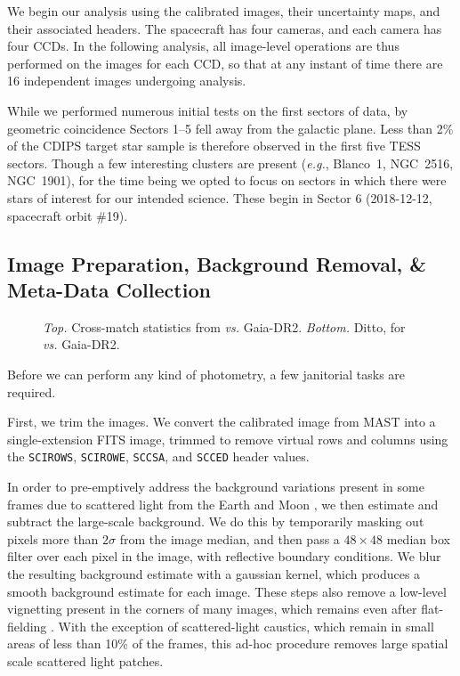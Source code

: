 \documentclass[12pt,twocolumn,tighten]{aastex62}
\begin{document}
We begin our analysis using the calibrated images, their uncertainty
maps, and their associated headers.  The spacecraft has four cameras,
and each camera has four CCDs.  In the following analysis, all
image-level operations are thus performed on the images for each CCD,
so that at any instant of time there are 16 independent images
undergoing analysis.

While we performed numerous initial tests on the first sectors of data,
by geometric coincidence Sectors 1--5 fell away from the galactic plane.
Less than 2\% of the CDIPS target star sample
is therefore observed in the first five TESS sectors.
Though a few interesting clusters are present ({\it e.g.}, Blanco~1, NGC~2516, NGC~1901),
for the time being we opted to focus on sectors in which there were stars
of interest for our intended science.
These begin in Sector 6 (2018-12-12, spacecraft orbit \#19).


\subsection{Image Preparation, Background Removal, \& Meta-Data Collection}
\label{subsec:preparation}

\begin{figure}[!ht]
  \vspace{-0.8cm}
  \caption{
      {\it Top.} Cross-match statistics from \cite{Kharchenko_et_al_2013} {\it 
      vs.} Gaia-DR2.
      {\it Bottom.} Ditto, for \cite{dias_proper_2014} {\it vs.} Gaia-DR2.
  }
  \label{fig:xmatch_info}
\end{figure}



Before we can perform any kind of photometry, a few janitorial tasks
are required.

First, we trim the images.  We convert the calibrated image from MAST
into a single-extension FITS image, trimmed to remove virtual rows and
columns using the \texttt{SCIROWS}, \texttt{SCIROWE}, \texttt{SCCSA},
and \texttt{SCCED} header values.

In order to pre-emptively address the background
variations present in some frames due to scattered light from the
Earth and Moon \citep[see][\S 7.3.1--7.3.4]{vanderspek_2018},
we then estimate and subtract the large-scale background.
We do this by
temporarily masking out pixels more than $2\sigma$ from the image median,
and then pass a $48\times48$ median box filter over each pixel in
the image, with reflective boundary conditions. 
We blur the resulting background estimate with a gaussian kernel,
which produces a
smooth background estimate for each image.  These steps also remove
a low-level vignetting
present in the corners of many images, which remains even after
flat-fielding \citep[see][\S 7.3.5]{vanderspek_2018}.
With the exception of scattered-light caustics, which remain in small
areas of less than 10\% of the frames, this ad-hoc procedure removes
large spatial scale scattered light patches.
\end{document}
